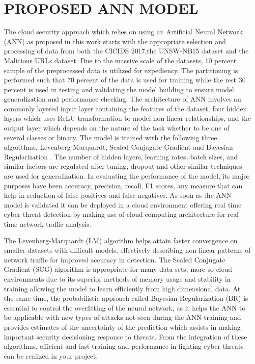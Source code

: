 \documentclass{llncs}
\begin{document}
\section{PROPOSED ANN MODEL}
The cloud security approach which relies on using an Artificial Neural Network (ANN) as proposed in this work starts with the appropriate selection and processing of data from both the CICIDS 2017,the UNSW-NB15 dataset and the Malicious URLs dataset. Due to the massive scale of the datasets, 10 percent sample of the preprocessed data is utilized for expediency. The partitioning is performed such that 70 percent  of the data is used for training while the rest 30 percent is used in testing and validating the model building to ensure model generalization and performance checking. The architecture of ANN involves an commonly layered input layer containing the features of the dataset, four hidden layers which uses ReLU transformation to model non-linear relationships, and the output layer which depends on the nature of the task whether to be one of several classes or binary. The model is trained with the following three algorithms, Levenberg-Marquardt, Scaled Conjugate Gradient and Bayesian Regularization . The number of hidden layers, learning rates, batch sizes, and similar factors are regulated after tuning, dropout and other similar techniques are used for generalization. In evaluating the performance of the model, its major purposes have been accuracy, precision, recall, F1 scores, any measure that can help in reduction of false positives and false negatives.
As soon as the ANN model is validated it can be deployed in a cloud environment offering real time cyber threat detection by making use of cloud computing architecture for real time network traffic analysis.

The Levenberg-Marquardt (LM) algorithm helps attain faster convergence on smaller datasets with difficult models, effectively describing non-linear patterns of network traffic for improved accuracy in detection. The Scaled Conjugate Gradient (SCG) algorithm is appropriate for many data sets, more so cloud environments due to its superior methods of memory usage and stability in training allowing the model to learn efficiently from high dimensional data. At the same time, the probabilistic approach called Bayesian Regularization (BR) is essential to control the overfitting of the neural network, as it helps the ANN to be applicable with new types of attacks not seen during the ANN training and provides estimates of the uncertainty of the prediction which assists in making important security decisioning response to threats. From the integration of these algorithms, efficient and fast training and performance in fighting cyber threats can be realized in your project.
\end{document}
